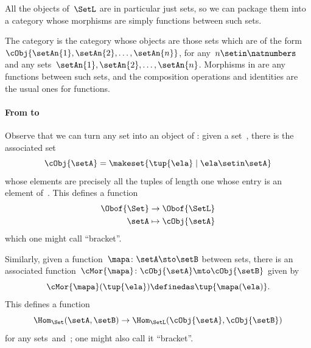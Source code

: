 All the objects of~$\SetL$ are in particular just sets, so we can package them into a category whose morphisms are simply functions between such sets.

\begin{ctdefinition}[\SetL]\label{def:SetL}
    The category \SetL is the category whose objects are those sets which are of the form~$\cObj{\setAn{1}, \setAn{2}, \ldots, \setAn{n}}$, for any~$n \setin \natnumbers$ and any sets~$\setAn{1}, \setAn{2}, \ldots, \setAn{n}$.
    Morphisms in \SetL are any functions between such sets, and the composition operations and identities are the usual ones for functions.
\end{ctdefinition}

\paragraph{From \Set to~\SetL}

Observe that we can turn any set into an object of \SetL: given a set~\setA, there is the associated set
\begin{equation}
    \label{eq:setintosetl}
    \cObj{\setA} = \makeset{ \tup{\ela} \mid \ela \setin \setA }
\end{equation}
whose elements are precisely all the tuples of length one whose entry is an element of~\setA.
This defines a function
\begin{equation}
    \label{eq:setintosetlfunction}
    \begin{aligned}
        \Obof{\Set} & \to \Obof{\SetL} \\
        \setA       & \mapsto \cObj{\setA}
    \end{aligned}
\end{equation}
which one might call ``bracket''.

Similarly, given a function~$\mapa \colon \setA \sto \setB$ between sets, there is an associated function~$\cMor{ \mapa }\colon \cObj{\setA} \mto \cObj{\setB}$ given by
\begin{equation}
    \label{eq:functionintosetlmor}
    \cMor{ \mapa } ( \tup{\ela }) \definedas \tup{\mapa(\ela)}.
\end{equation}
This defines a function
\begin{equation}
    \label{eq:functionintosetlmorfun}
    \Hom_{\Set}(\setA,\setB) \to \Hom_{\SetL}(\cObj{\setA},\cObj{\setB})
\end{equation}
for any sets~\setA and~\setB; one might also call it ``bracket''.

